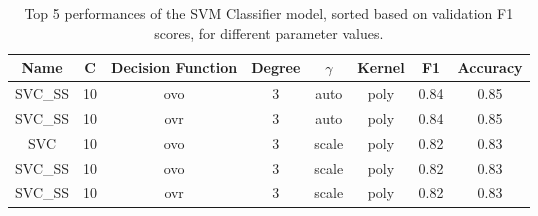 \begin{table}[H]
	\centering
	\begin{tabular}{c c c c c c c c}
	\hline
	\hline
	\textbf{Name} & \textbf{C}& \textbf{Decision Function} & \textbf{Degree} & \textbf{$\gamma$} & \textbf{Kernel} & \textbf{F1} & \textbf{Accuracy} \\
	\hline
	\hline
	SVC\_SS & 10 & ovo & 3 & auto & poly & 0.84 & 0.85\\
	SVC\_SS & 10 & ovr & 3 & auto & poly & 0.84 & 0.85\\
	SVC & 10 & ovo & 3 & scale & poly & 0.82 & 0.83\\
	SVC\_SS & 10 & ovo & 3 & scale & poly & 0.82 & 0.83\\
	SVC\_SS & 10 & ovr & 3 & scale & poly & 0.82 & 0.83\\
	\hline
	\end{tabular}

	\caption{Top 5 performances of the SVM Classifier model, sorted based on validation F1 scores, for different parameter values.}
	\label{tab:svc}
\end{table}

